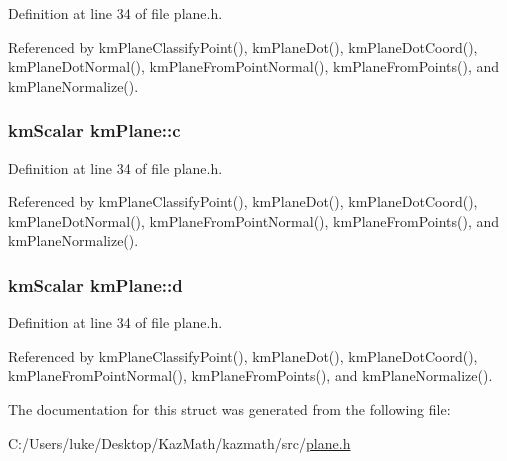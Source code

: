 Definition at line 34 of file plane.h.

Referenced by kmPlaneClassifyPoint(), kmPlaneDot(), kmPlaneDotCoord(), kmPlaneDotNormal(), kmPlaneFromPointNormal(), kmPlaneFromPoints(), and kmPlaneNormalize().\hypertarget{structkm_plane_46fb82aee3e4ccec7bb027ba53998600}{
\subsubsection[{c}]{\setlength{\rightskip}{0pt plus 5cm}kmScalar {\bf kmPlane::c}}}
\label{structkm_plane_46fb82aee3e4ccec7bb027ba53998600}




Definition at line 34 of file plane.h.

Referenced by kmPlaneClassifyPoint(), kmPlaneDot(), kmPlaneDotCoord(), kmPlaneDotNormal(), kmPlaneFromPointNormal(), kmPlaneFromPoints(), and kmPlaneNormalize().\hypertarget{structkm_plane_a3c74528242125229ab0038e9a09b803}{
\subsubsection[{d}]{\setlength{\rightskip}{0pt plus 5cm}kmScalar {\bf kmPlane::d}}}
\label{structkm_plane_a3c74528242125229ab0038e9a09b803}




Definition at line 34 of file plane.h.

Referenced by kmPlaneClassifyPoint(), kmPlaneDot(), kmPlaneDotCoord(), kmPlaneFromPointNormal(), kmPlaneFromPoints(), and kmPlaneNormalize().

The documentation for this struct was generated from the following file:\begin{CompactItemize}
\item 
C:/Users/luke/Desktop/KazMath/kazmath/src/\hyperlink{plane_8h}{plane.h}\end{CompactItemize}
